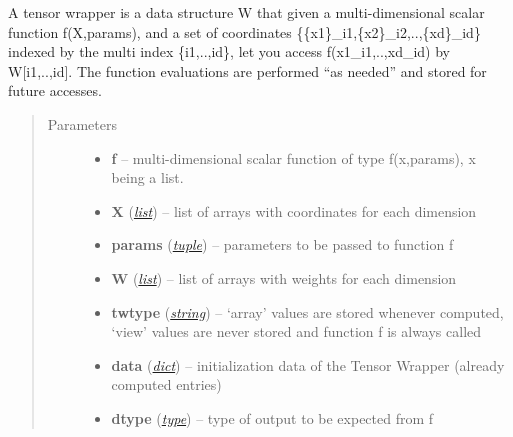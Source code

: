 \documentclass[a4paper,10pt,english]{sphinxmanual}
\begin{document}
\begin{fulllineitems}
\label{api-tw:TensorToolbox.core.TensorWrapper}
A tensor wrapper is a data structure W that given a multi-dimensional scalar function f(X,params), and a set of coordinates \{\{x1\}\_i1,\{x2\}\_i2,..,\{xd\}\_id\} indexed by the multi index \{i1,..,id\}, let you access f(x1\_i1,..,xd\_id) by W{[}i1,..,id{]}. The function evaluations are performed ``as needed'' and stored for future accesses.
\begin{quote}\begin{description}
\item[{Parameters}] \leavevmode\begin{itemize}
\item {} 
\textbf{f} -- multi-dimensional scalar function of type f(x,params), x being a list.

\item {} 
\textbf{X} (\href{http://docs.python.org/library/functions.html\#list}{\emph{list}}) -- list of arrays with coordinates for each dimension

\item {} 
\textbf{params} (\href{http://docs.python.org/library/functions.html\#tuple}{\emph{tuple}}) -- parameters to be passed to function f

\item {} 
\textbf{W} (\href{http://docs.python.org/library/functions.html\#list}{\emph{list}}) -- list of arrays with weights for each dimension

\item {} 
\textbf{twtype} (\href{http://docs.python.org/library/string.html\#module-string}{\emph{string}}) -- `array' values are stored whenever computed, `view' values are never stored and function f is always called

\item {} 
\textbf{data} (\href{http://docs.python.org/library/stdtypes.html\#dict}{\emph{dict}}) -- initialization data of the Tensor Wrapper (already computed entries)

\item {} 
\textbf{dtype} (\href{http://docs.python.org/library/functions.html\#type}{\emph{type}}) -- type of output to be expected from f


\end{itemize}
\end{description}
\end{quote}
\end{fulllineitems}
\end{document}
